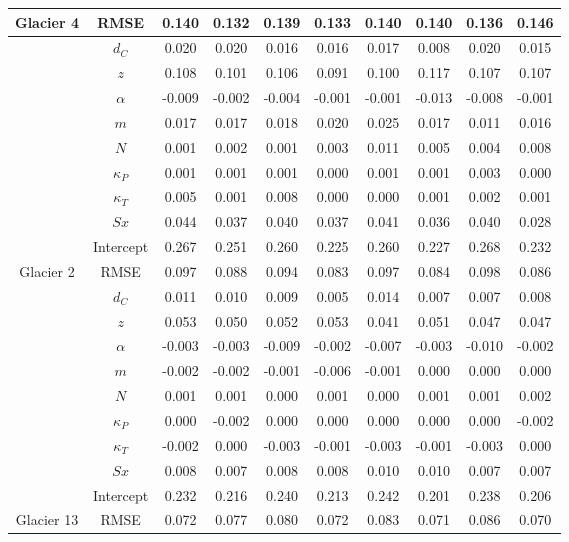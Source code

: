 \documentclass[12pt]{article}
\begin{document}
\begin{landscape}
\begin{table}
\begin{tabular}{cccccccccc}
\multirow{-10}{*}{Glacier 4} & RMSE & 0.140 & 0.132 & 0.139 & 0.133 & 0.140 & 0.140 & 0.136 & 0.146 \\ \hline
 & $d_C$ & 0.020 & 0.020 & 0.016 & 0.016 & 0.017 & 0.008 & 0.020 & 0.015 \\
 & $z$ & 0.108 & 0.101 & 0.106 & 0.091 & 0.100 & 0.117 & 0.107 & 0.107 \\
 & $\alpha$ & -0.009 & -0.002 & -0.004 & -0.001 & -0.001 & -0.013 & -0.008 & -0.001 \\
 & $m$ & 0.017 & 0.017 & 0.018 & 0.020 & 0.025 & 0.017 & 0.011 & 0.016 \\
 & $N$ & 0.001 & 0.002 & 0.001 & 0.003 & 0.011 & 0.005 & 0.004 & 0.008 \\
 & $\kappa_P$ & 0.001 & 0.001 & 0.001 & 0.000 & 0.001 & 0.001 & 0.003 & 0.000 \\
 & $\kappa_T$ & 0.005 & 0.001 & 0.008 & 0.000 & 0.000 & 0.001 & 0.002 & 0.001 \\
 & $Sx$ & 0.044 & 0.037 & 0.040 & 0.037 & 0.041 & 0.036 & 0.040 & 0.028 \\
 & Intercept & 0.267 & 0.251 & 0.260 & 0.225 & 0.260 & 0.227 & 0.268 & 0.232 \\
\multirow{-10}{*}{Glacier 2} & RMSE & 0.097 & 0.088 & 0.094 & 0.083 & 0.097 & 0.084 & 0.098 & 0.086 \\ \hline
 
 & $d_C$ & 0.011 & 0.010 & 0.009 & 0.005 & 0.014 & 0.007 & 0.007 & 0.008 \\
 
 & $z$ & 0.053 & 0.050 & 0.052 & 0.053 & 0.041 & 0.051 & 0.047 & 0.047 \\
 
 & $\alpha$ & -0.003 & -0.003 & -0.009 & -0.002 & -0.007 & -0.003 & -0.010 & -0.002 \\
 
 & $m$ & -0.002 & -0.002 & -0.001 & -0.006 & -0.001 & 0.000 & 0.000 & 0.000 \\
 
 & $N$ & 0.001 & 0.001 & 0.000 & 0.001 & 0.000 & 0.001 & 0.001 & 0.002 \\
 
 & $\kappa_P$ & 0.000 & -0.002 & 0.000 & 0.000 & 0.000 & 0.000 & 0.000 & -0.002 \\
 
 & $\kappa_T$ & -0.002 & 0.000 & -0.003 & -0.001 & -0.003 & -0.001 & -0.003 & 0.000 \\
 
 & $Sx$ & 0.008 & 0.007 & 0.008 & 0.008 & 0.010 & 0.010 & 0.007 & 0.007 \\
 
 & Intercept & 0.232 & 0.216 & 0.240 & 0.213 & 0.242 & 0.201 & 0.238 & 0.206 \\
 
\multirow{-10}{*}{Glacier 13} & RMSE & 0.072 & 0.077 & 0.080 & 0.072 & 0.083 & 0.071 & 0.086 & 0.070
\end{tabular}
\end{table}
\end{landscape}
\end{document}
